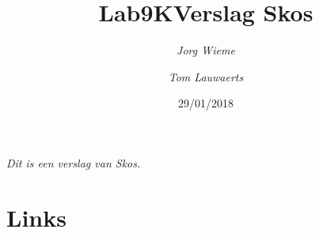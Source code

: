 \documentclass[12pt, letterpaper, oneside]{article}
\title{Lab9K\endgraf\textbf{Verslag Skos}}
\date{29/01/2018}
\author{\textit{Jorg Wieme}
	 	\and
 		\textit{Tom Lauwaerts}}
\begin{document}
\begin{titlepage}
\maketitle
\thispagestyle{empty}
\end{titlepage}

\begin{adjustwidth}{6.0em}{6.0em}
\centering \textit{Dit is een verslag van Skos.}
\end{adjustwidth}
\newpage

\tableofcontents


\newpage
\appendix

\section{Links}
\end{document}
